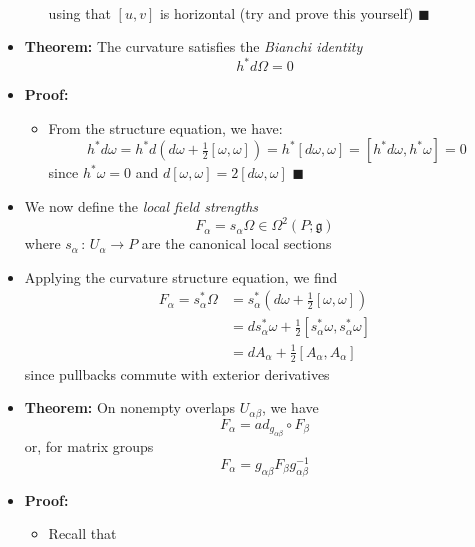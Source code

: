 \documentclass[12pt,a4paper]{article}
\numberwithin{equation}{section}
\begin{document}
\begin{itemize}
\begin{itemize}
$$\begin{aligned}
			\end{aligned}
			$$
			using that $[u,v]$ is horizontal (try and prove this yourself) $\blacksquare$
		\end{itemize}
		\item \textbf{Theorem:} The curvature satisfies the \textit{Bianchi identity}
		\begin{equation}
			h^{*}d\Omega=0
		\end{equation}
		\item \textbf{Proof:}
		\begin{itemize}
			\item From the structure equation, we have:
			$$
			h^{*}d\omega=h^{*}d(d\omega+\tfrac{1}{2}[\omega,\omega])=h^{*}[d\omega,\omega]=[h^{*}d\omega,h^{*}\omega]=0
			$$
			since $h^{*}\omega=0$ and $d[\omega,\omega]=2[d\omega,\omega]$ $\blacksquare$
		\end{itemize}
		\item We now define the \textit{local field strengths}
		\begin{equation}
			F_{\alpha}=s_{\alpha}\Omega\in\Omega^{2}(P;\mathfrak{g})
		\end{equation}
		where $s_{\alpha}\,:\,U_{\alpha}\to P$ are the canonical local sections
		\item Applying the curvature structure equation, we find
		\begin{equation}
			\begin{aligned} 
			F_{\alpha}=s^{*}_{\alpha}\Omega&=s^{*}_{\alpha}(d\omega+\tfrac{1}{2}[\omega,\omega])\\&=ds^{*}_{\alpha}\omega+\tfrac{1}{2}[s^{*}_{\alpha}\omega,s^{*}_{\alpha}\omega]\\&=dA_{\alpha}+\tfrac{1}{2}[A_{\alpha},A_{\alpha}]
			\end{aligned}
		\end{equation}
		since pullbacks commute with exterior derivatives
		\item \textbf{Theorem:} On nonempty overlaps $U_{\alpha\beta}$, we have
		\begin{equation}
			F_{\alpha}=ad_{g_{\alpha\beta}}\circ F_{\beta}
		\end{equation}
		or, for matrix groups
		\begin{equation}
			F_{\alpha}=g_{\alpha\beta}F_{\beta}g_{\alpha\beta}^{-1}
		\end{equation}
		\item \textbf{Proof:}
		\begin{itemize}
			\item Recall that

\end{itemize}
\end{itemize}
\end{document}
